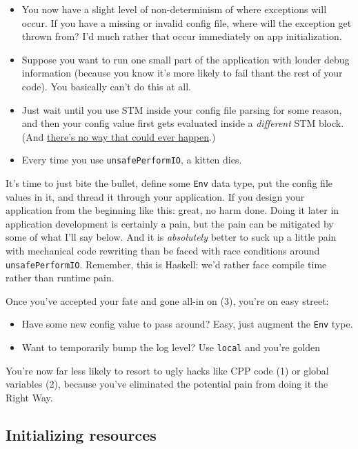 \begin{itemize}

\item
  You now have a slight level of non-determinism of where exceptions
  will occur. If you have a missing or invalid config file, where will
  the exception get thrown from? I'd much rather that occur immediately
  on app initialization.
\item
  Suppose you want to run one small part of the application with louder
  debug information (because you know it's more likely to fail thant the
  rest of your code). You basically can't do this at all.
\item
  Just wait until you use STM inside your config file parsing for some
  reason, and then your config value first gets evaluated inside a
  \emph{different} STM block. (And
  \href{https://github.com/snoyberg/yaml/issues/86}{there's no way that
  could ever happen}.)
\item
  Every time you use \texttt{unsafePerformIO}, a kitten dies.
\end{itemize}
It's time to just bite the bullet, define some \texttt{Env} data type,
put the config file values in it, and thread it through your
application. If you design your application from the beginning like
this: great, no harm done. Doing it later in application development is
certainly a pain, but the pain can be mitigated by some of what I'll say
below. And it is \emph{absolutely} better to suck up a little pain with
mechanical code rewriting than be faced with race conditions around
\texttt{unsafePerformIO}. Remember, this is Haskell: we'd rather face
compile time rather than runtime pain.

Once you've accepted your fate and gone all-in on (3), you're on easy
street:

\begin{itemize}

\item
  Have some new config value to pass around? Easy, just augment the
  \texttt{Env} type.
\item
  Want to temporarily bump the log level? Use \texttt{local} and you're
  golden
\end{itemize}
You're now far less likely to resort to ugly hacks like CPP code (1) or
global variables (2), because you've eliminated the potential pain from
doing it the Right Way.

\subsection{Initializing resources}

